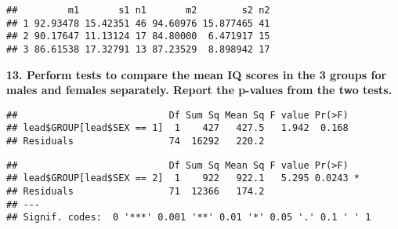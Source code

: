 \documentclass[
]{article}
\newenvironment{Shaded}{\begin{snugshade}}{\end{snugshade}}
\newcommand{\AttributeTok}[1]{\textcolor[rgb]{0.77,0.63,0.00}{#1}}
\newcommand{\DecValTok}[1]{\textcolor[rgb]{0.00,0.00,0.81}{#1}}
\newcommand{\FunctionTok}[1]{\textcolor[rgb]{0.00,0.00,0.00}{#1}}
\newcommand{\NormalTok}[1]{#1}
\newcommand{\SpecialCharTok}[1]{\textcolor[rgb]{0.00,0.00,0.00}{#1}}
\begin{document}
\begin{verbatim}
##         m1       s1 n1       m2        s2 n2
## 1 92.93478 15.42351 46 94.60976 15.877465 41
## 2 90.17647 11.13124 17 84.80000  6.471917 15
## 3 86.61538 17.32791 13 87.23529  8.898942 17
\end{verbatim}

\textbf{13. Perform tests to compare the mean IQ scores in the 3 groups
for males and females separately. Report the p-values from the two
tests.}

\begin{Shaded}
\end{Shaded}

\begin{verbatim}
##                           Df Sum Sq Mean Sq F value Pr(>F)
## lead$GROUP[lead$SEX == 1]  1    427   427.5   1.942  0.168
## Residuals                 74  16292   220.2
\end{verbatim}

\begin{Shaded}
\end{Shaded}

\begin{verbatim}
##                           Df Sum Sq Mean Sq F value Pr(>F)  
## lead$GROUP[lead$SEX == 2]  1    922   922.1   5.295 0.0243 *
## Residuals                 71  12366   174.2                 
## ---
## Signif. codes:  0 '***' 0.001 '**' 0.01 '*' 0.05 '.' 0.1 ' ' 1
\end{verbatim}
\end{document}
